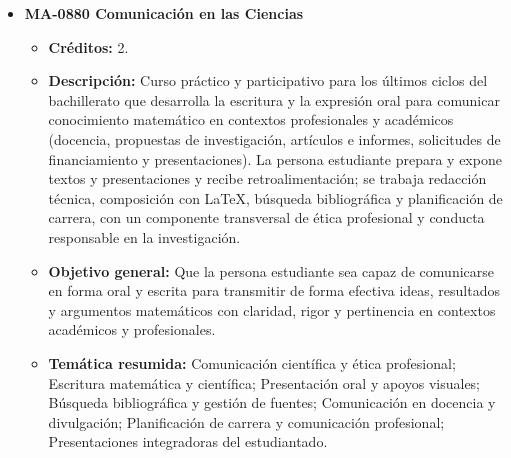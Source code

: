 \begin{itemize}[leftmargin=1.3em, itemsep=10pt, topsep=4pt, label={\color{Azul-UCR}$\blacksquare$}]
\item {\color{Azul-UCR}\textbf{MA-0880 Comunicación en las Ciencias}}\par\nopagebreak\smallskip
\begin{itemize}[leftmargin=1.1em, itemsep=3pt, topsep=2pt, parsep=2pt, label={\textendash}]
\item \textbf{Créditos:} 2.
\item \textbf{Descripción:} Curso práctico y participativo para los últimos ciclos del bachillerato que desarrolla la escritura y la expresión oral para comunicar conocimiento matemático en contextos profesionales y académicos (docencia, propuestas de investigación, artículos e informes, solicitudes de financiamiento y presentaciones). La persona estudiante prepara y expone textos y presentaciones y recibe retroalimentación; se trabaja redacción técnica, composición con \LaTeX{}, búsqueda bibliográfica y planificación de carrera, con un componente transversal de ética profesional y conducta responsable en la investigación.
\item \textbf{Objetivo general:} Que la persona estudiante sea capaz de comunicarse en forma oral y escrita para transmitir de forma efectiva ideas, resultados y argumentos matemáticos con claridad, rigor y pertinencia en contextos académicos y profesionales.
\item \textbf{Temática resumida:} Comunicación científica y ética profesional; Escritura matemática y científica; Presentación oral y apoyos visuales; Búsqueda bibliográfica y gestión de fuentes; Comunicación en docencia y divulgación; Planificación de carrera y comunicación profesional; Presentaciones integradoras del estudiantado.
\end{itemize}


\end{itemize}
